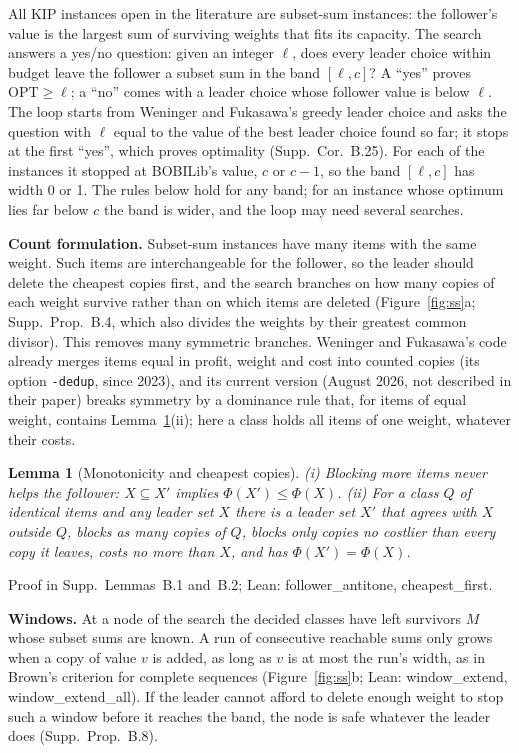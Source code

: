 \documentclass[]{spie}  %
\theoremstyle{plain}
\newtheorem{lem}[thm]{Lemma}
\newcommand{\lean}[1]{\mbox{\ttfamily #1}}   %
\newcommand{\code}[1]{\texttt{#1}}
\newcommand{\OPT}{\mathrm{OPT}}
\begin{document}
All \NumNewKip{} KIP instances open in the literature are subset-sum instances: the follower's
value is the largest sum of surviving weights that fits its capacity. The search answers a
yes/no question: given an integer $\ell$, does every leader choice within budget leave the
follower a subset sum in the band $[\ell,c]$? A ``yes'' proves $\OPT\ge\ell$; a ``no'' comes with
a leader choice whose follower value is below $\ell$. The loop starts from Weninger and
Fukasawa's greedy leader choice and asks the question with $\ell$ equal to the value of the best
leader choice found so far; it stops at the first ``yes'', which proves optimality (Supp.\
Cor.~B.25). For each of the \NumNewKip{} instances it stopped at BOBILib's value, $c$ or $c-1$, so
the band $[\ell,c]$ has width 0 or 1. The rules below hold for any band; for an instance whose
optimum lies far below $c$ the band is wider, and the loop may need several searches.

\textbf{Count formulation.} Subset-sum instances have many items with the same weight. Such items
are interchangeable for the follower, so the leader should delete the cheapest copies first,
and the search branches on how many copies of each weight survive rather than on which items
are deleted (Figure~\ref{fig:ss}a; Supp.\ Prop.~B.4, which also divides the weights by their
greatest common divisor). This removes many symmetric branches. Weninger and Fukasawa's code
already merges items equal in profit, weight and cost into counted copies (its option
\code{-dedup}, since 2023), and its current version (August 2026, not described in their paper)
breaks symmetry by a dominance rule that, for items of equal weight, contains
Lemma~\ref{lem:count}(ii);\cite{weninger_bkpsolver} here a class holds all items of one weight,
whatever their costs.

\begin{lem}[Monotonicity and cheapest copies]\label{lem:count}
(i) Blocking more items never helps the follower: $X\subseteq X'$ implies $\Phi(X')\le\Phi(X)$.
(ii) For a class $Q$ of identical items and any leader set $X$ there is a leader set $X'$ that
agrees with $X$ outside $Q$, blocks as many copies of $Q$, blocks only copies no costlier than
every copy it leaves, costs no more than $X$, and has $\Phi(X')=\Phi(X)$.
\end{lem}
\noindent Proof in Supp.\ Lemmas~B.1 and~B.2; Lean: \lean{follower\_antitone},
\lean{cheapest\_first}.

\textbf{Windows.} At a node of the search the decided classes have left survivors $M$ whose subset
sums are known. A run of consecutive reachable sums only grows when a copy of value $v$ is added,
as long as $v$ is at most the run's width, as in Brown's criterion for complete
sequences\cite{brown1961note} (Figure~\ref{fig:ss}b; Lean: \lean{window\_extend},
\lean{window\_extend\_all}). If the leader cannot afford to delete enough weight to stop such a
window before it reaches the band, the node is safe whatever the leader does (Supp.\
Prop.~B.8).
\end{document}
